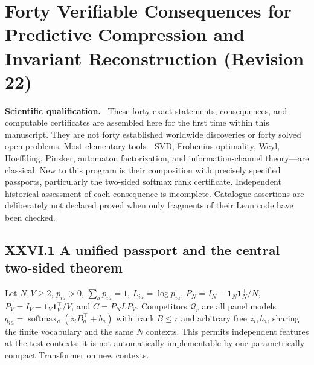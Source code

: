 \documentclass[11pt,a4paper,oneside]{book}
\newcommand{\one}{\mathbf 1}\newcommand{\ii}{\mathrm i}\newcommand{\dd}{\mathrm d}
\DeclareMathOperator{\rank}{rank}\DeclareMathOperator{\Tr}{Tr}
\newcommand{\note}[1]{\par\medskip\noindent\textbf{#1}\ }
\begin{document}
\chapter{Forty Verifiable Consequences for Predictive Compression and Invariant Reconstruction (Revision 22)}
\note{Scientific qualification.} These forty exact statements, consequences, and computable certificates are assembled here for the first time within this manuscript. They are not forty established worldwide discoveries or forty solved open problems. Most elementary tools---SVD, Frobenius optimality, Weyl, Hoeffding, Pinsker, automaton factorization, and information-channel theory---are classical. New to this program is their composition with precisely specified passports, particularly the two-sided softmax rank certificate. Independent historical assessment of each consequence is incomplete. Catalogue assertions are deliberately not declared proved when only fragments of their Lean code have been checked.
\section*{XXVI.1 A unified passport and the central two-sided theorem}
Let $N,V\ge2$, $p_{ia}>0$, $\sum_a p_{ia}=1$, $L_{ia}=\log p_{ia}$, $P_N=I_N-\one_N\one_N^\top/N$, $P_V=I_V-\one_V\one_V^\top/V$, and $C=P_NLP_V$. Competitors $\mathcal Q_r$ are all panel models $q_{ia}=\operatorname{softmax}_a(z_iB_a^\top+b_a)$ with $\rank B\le r$ and arbitrary free $z_i,b_a$, sharing the finite vocabulary and the same $N$ contexts. This permits independent features at the test contexts; it is not automatically implementable by one parametrically compact Transformer on new contexts.
\end{document}
